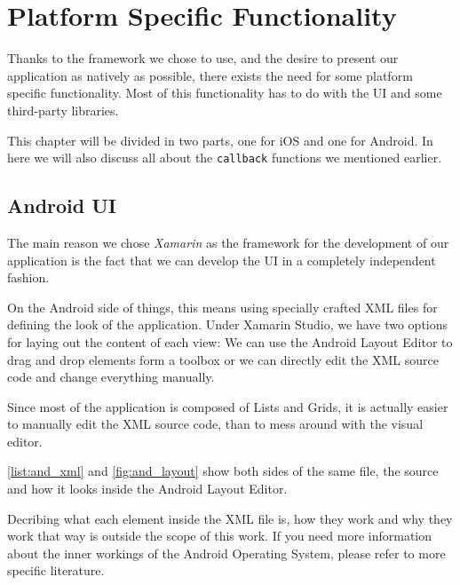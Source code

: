 \chapter{Platform Specific Functionality}\label{ch:ui}

Thanks to the framework we chose to use, and the desire to present our application as natively as possible, there exists the need for some platform specific functionality. Most of this functionality has to do with the \ac{UI} and some third-party libraries.

This chapter will be divided in two parts, one for iOS and one for Android. In here we will also discuss all about the \texttt{callback} functions we mentioned earlier. 

\section{Android UI}

The main reason we chose \textit{Xamarin} as the framework for the development of our application is the fact that we can develop the \ac{UI} in a completely independent fashion.

On the Android side of things, this means using specially crafted \ac{XML} files for defining the look of the application. Under Xamarin Studio, we have two options for laying out the content of each view:  We can use the Android Layout Editor to drag and drop elements form a toolbox or we can  directly edit the \ac{XML} source code and change everything manually.

Since most of the application is composed of Lists and Grids, it is actually easier to manually edit the \ac{XML} source code, than to mess around with the visual editor.

\autoref{list:and_xml} and \autoref{fig:and_layout} show both sides of the same file, the source and how it looks inside the Android Layout Editor.

Decribing what each element inside the \ac{XML} file is, how they work and why they work that way is outside the scope of this work. If you need more information about the inner workings of the Android Operating System, please refer to more specific literature.


